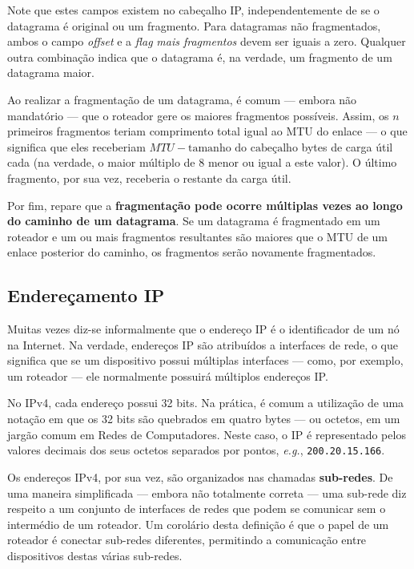 \documentclass{article}
\begin{document}
Note que estes campos existem no cabeçalho IP, independentemente de se o datagrama é original ou um fragmento. Para datagramas não fragmentados, ambos o campo \textit{offset} e a \textit{flag} \textit{mais fragmentos} devem ser iguais a zero. Qualquer outra combinação indica que o datagrama é, na verdade, um fragmento de um datagrama maior.

Ao realizar a fragmentação de um datagrama, é comum --- embora não mandatório --- que o roteador gere os maiores fragmentos possíveis. Assim, os $n$ primeiros fragmentos teriam comprimento total igual ao MTU do enlace --- o que significa que eles receberiam $MTU - \text{tamanho do cabeçalho}$ bytes de carga útil cada (na verdade, o maior múltiplo de 8 menor ou igual a este valor). O último fragmento, por sua vez, receberia o restante da carga útil.

Por fim, repare que a \textbf{fragmentação pode ocorre múltiplas vezes ao longo do caminho de um datagrama}. Se um datagrama é fragmentado em um roteador e um ou mais fragmentos resultantes são maiores que o MTU de um enlace posterior do caminho, os fragmentos serão novamente fragmentados.

\subsection{Endereçamento IP}

Muitas vezes diz-se informalmente que o endereço IP é o identificador de um nó na Internet. Na verdade, endereços IP são atribuídos a interfaces de rede, o que significa que se um dispositivo possui múltiplas interfaces --- como, por exemplo, um roteador --- ele normalmente possuirá múltiplos endereços IP.

No IPv4, cada endereço possui 32 bits. Na prática, é comum a utilização de uma notação em que os 32 bits são quebrados em quatro bytes --- ou octetos, em um jargão comum em Redes de Computadores. Neste caso, o IP é representado pelos valores decimais dos seus octetos separados por pontos, \textit{e.g.}, \texttt{200.20.15.166}.

Os endereços IPv4, por sua vez, são organizados nas chamadas \textbf{sub-redes}. De uma maneira simplificada --- embora não totalmente correta --- uma sub-rede diz respeito a um conjunto de interfaces de redes que podem se comunicar sem o intermédio de um roteador. Um corolário desta definição é que o papel de um roteador é conectar sub-redes diferentes, permitindo a comunicação entre dispositivos destas várias sub-redes.
\end{document}

